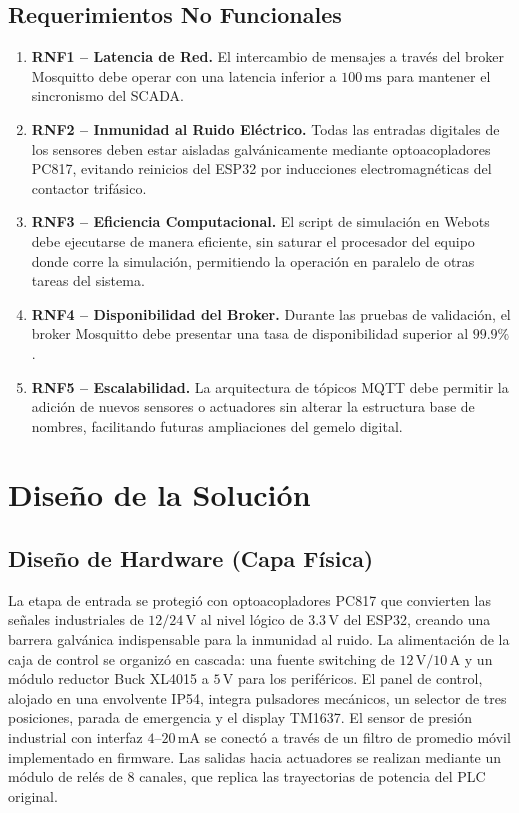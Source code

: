 \subsection{Requerimientos No Funcionales}
\begin{enumerate}
    \item \textbf{RNF1 – Latencia de Red.} El intercambio de mensajes a través del broker Mosquitto debe operar con una latencia inferior a $100\,\text{ms}$ para mantener el sincronismo del SCADA.
    \item \textbf{RNF2 – Inmunidad al Ruido Eléctrico.} Todas las entradas digitales de los sensores deben estar aisladas galvánicamente mediante optoacopladores PC817, evitando reinicios del ESP32 por inducciones electromagnéticas del contactor trifásico.
    \item \textbf{RNF3 – Eficiencia Computacional.} El script de simulación en Webots debe ejecutarse de manera eficiente, sin saturar el procesador del equipo donde corre la simulación, permitiendo la operación en paralelo de otras tareas del sistema.
    \item \textbf{RNF4 – Disponibilidad del Broker.} Durante las pruebas de validación, el broker Mosquitto debe presentar una tasa de disponibilidad superior al $99.9\%$.
    \item \textbf{RNF5 – Escalabilidad.} La arquitectura de tópicos MQTT debe permitir la adición de nuevos sensores o actuadores sin alterar la estructura base de nombres, facilitando futuras ampliaciones del gemelo digital.
\end{enumerate}

\section{Diseño de la Solución}
\label{sec:diseno_solucion}
\subsection{Diseño de Hardware (Capa Física)}
La etapa de entrada se protegió con optoacopladores PC817 que convierten las señales industriales de $12/24\,\text{V}$ al nivel lógico de $3.3\,\text{V}$ del ESP32, creando una barrera galvánica indispensable para la inmunidad al ruido. La alimentación de la caja de control se organizó en cascada: una fuente switching de $12\,\text{V}/10\,\text{A}$ y un módulo reductor Buck XL4015 a $5\,\text{V}$ para los periféricos. El panel de control, alojado en una envolvente IP54, integra pulsadores mecánicos, un selector de tres posiciones, parada de emergencia y el display TM1637. El sensor de presión industrial con interfaz $4$–$20\,\text{mA}$ se conectó a través de un filtro de promedio móvil implementado en firmware. Las salidas hacia actuadores se realizan mediante un módulo de relés de 8 canales, que replica las trayectorias de potencia del PLC original.

